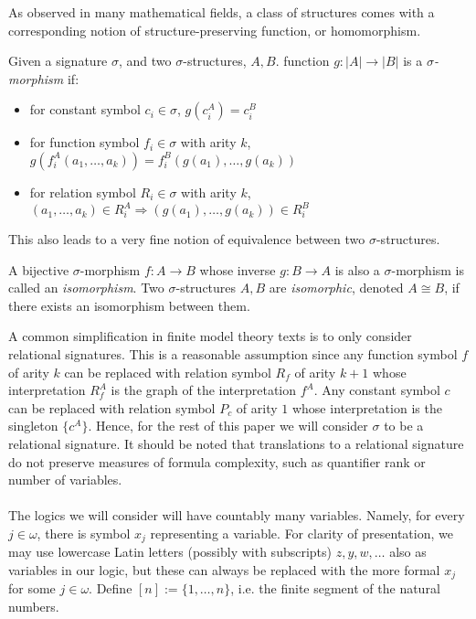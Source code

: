 As observed in many mathematical fields, a class of structures comes with a corresponding notion of structure-preserving function, or homomorphism. 
\begin{defn}
Given a signature $\sigma$, and two $\sigma$-structures, $A,B$. function $g:|A| \longrightarrow |B|$ is a \textit{$\sigma$-morphism} if: 
\begin{itemize}
    \item for constant symbol $c_{i} \in \sigma$, $g(c_{i}^{A}) = c_{i}^{B}$
    \item for function symbol $f_{i} \in \sigma$ with arity $k$, $g(f_{i}^{A}(a_{1},\dots,a_{k})) = f_{i}^{B}(g(a_{1}),\dots,g(a_{k}))$
    \item for relation symbol $R_{i} \in \sigma$ with arity $k$, $(a_{1},\dots,a_{k}) \in R_{i}^{A} \Rightarrow (g(a_{1}),\dots,g(a_{k})) \in R_{i}^{B}$
\end{itemize}
\end{defn}
This also leads to a very fine notion of equivalence between two $\sigma$-structures. 
\begin{defn}
A bijective $\sigma$-morphism $f:A \longrightarrow B$ whose inverse $g:B \longrightarrow A$ is also a $\sigma$-morphism is called an \textit{isomorphism}. Two $\sigma$-structures $A,B$ are \textit{isomorphic}, denoted $A \cong B$, if there exists an isomorphism between them. 
\end{defn}
A common simplification in finite model theory texts is to only consider relational signatures. This is a reasonable assumption since any function symbol $f$ of arity $k$ can be replaced with relation symbol $R_{f}$ of arity $k+1$ whose interpretation $R^{A}_{f}$ is the graph of the interpretation $f^{A}$. Any constant symbol $c$ can be replaced with relation symbol $P_{c}$ of arity $1$ whose interpretation is the singleton $\{c^{A}\}$. Hence, for the rest of this paper we will consider $\sigma$ to be a relational signature.  It should be noted that translations to a relational signature do not preserve measures of formula complexity, such as quantifier rank or number of variables. \\~\\
 The logics we will consider will have countably many variables. Namely, for every $j \in \omega$, there is symbol $x_{j}$ representing a variable. For clarity of presentation, we may use lowercase Latin letters (possibly with subscripts) $z,y,w,\dots$ also as variables in our logic, but these can always be replaced with the more formal $x_{j}$ for some $j \in \omega$. Define $[n] := \{1,\dots,n\}$, i.e. the finite segment of the natural numbers.   
